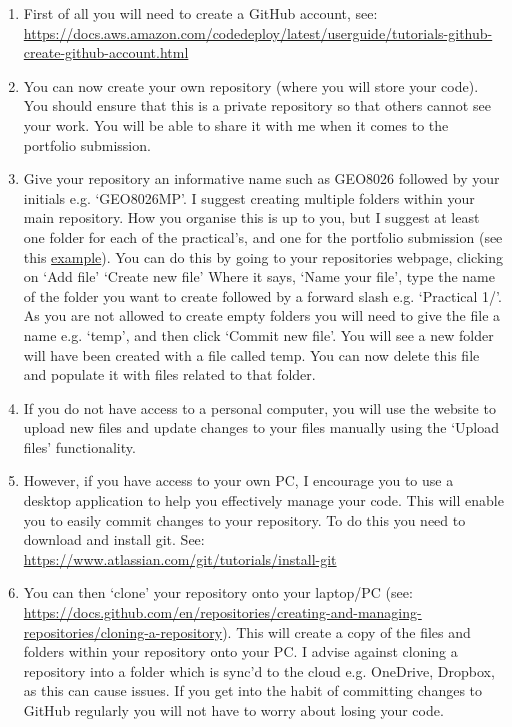 \documentclass[11pt,onecolumn,a4paper,notitlepage]{article}
\begin{document}
\begin{enumerate}
\item{First of all you will need to create a GitHub account, see: \url{https://docs.aws.amazon.com/codedeploy/latest/userguide/tutorials-github-create-github-account.html}}

\item{You can now create your own repository (where you will store your code). You should ensure that this is a private repository so that others cannot see your work. You will be able to share it with me when it comes to the portfolio submission.}

\item{Give your repository an informative name such as GEO8026 followed by your initials e.g. `GEO8026\textunderscore MP'. I suggest creating multiple folders within your main repository. How you organise this is up to you, but I suggest at least one folder for each of the practical's, and one for the portfolio submission (see this \href{https://github.com/CatchmentSci/GEO8026}{example}). You can do this by going to your repositories webpage, clicking on `Add file'  `Create new file' Where it says, `Name your file', type the name of the folder you want to create followed by a forward slash e.g. `Practical 1/'. As you are not allowed to create empty folders you will need to give the file a name e.g. `temp', and then click `Commit new file'. You will see a new folder will have been created with a file called temp. You can now delete this file and populate it with files related to that folder.}

\item{If you do not have access to a personal computer, you will use the website to upload new files and update changes to your files manually using the `Upload files' functionality.}

\item{However, if you have access to your own PC, I encourage you to use a desktop application to help you effectively manage your code. This will enable you to easily commit changes to your repository. To do this you need to download and install git. See: \url{https://www.atlassian.com/git/tutorials/install-git}}

\item{You can then `clone' your repository onto your laptop/PC (see: \url{https://docs.github.com/en/repositories/creating-and-managing-repositories/cloning-a-repository}). This will create a copy of the files and folders within your repository onto your PC. I advise against cloning a repository into a folder which is sync'd to the cloud e.g. OneDrive, Dropbox, as this can cause issues. If you get into the habit of committing changes to GitHub regularly you will not have to worry about losing your code.}


\end{enumerate}
\end{document}
